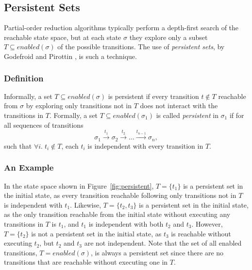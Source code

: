 \documentclass[12pt,a4paper,twoside,openright]{report}
\begin{document}
\subsection{Persistent Sets}
\label{sec:persistent}

Partial-order reduction algorithms typically 
perform a depth-first
search of the reachable state space, but at each
state $\sigma$ they explore only a subset
$T \subseteq \textit{enabled}(\sigma)$
of the possible transitions.
The use of \textit{persistent sets},
by Godefroid and Pirottin \cite{god93},
is such a technique.

\subsubsection{Definition}

Informally,
a set $T \subseteq \textit{enabled}(\sigma)$
is persistent if every
transition $t \not \in T$ reachable
from $\sigma$ by exploring only transitions not in
$T$ does not interact with the transitions
in $T$. Formally, a set
$T \subseteq \textit{enabled}(\sigma_1)$
is called \emph{persistent} in $\sigma_1$ if
for all sequences of transitions
\[
	\sigma_1 \xrightarrow{\ t_1\ } \sigma_2 \xrightarrow{\ t_2\ } \ldots
	\xrightarrow{t_{n-1}} \sigma_n,
\]
such that $\forall i.\; t_i \not \in T$,
each $t_i$ is
independent with every transition in $T$.

\subsubsection{An Example}
In the state space shown in
Figure~\ref{fig:persistent}, $T = \{t_1\}$ is
a persistent set in the initial state, as every
transition reachable following only transitions
not in $T$ is independent with $t_1$.
Likewise, $T = \{t_2, t_3\}$ is
a persistent set in the initial state, as the
only transition reachable from the initial state
without executing any transitions in $T$ is $t_1$,
and $t_1$ is independent with both $t_2$ and $t_3$.
However, $T = \{t_2\}$ is not a persistent set in the
initial state, as $t_3$ is reachable without
executing $t_2$, but $t_2$ and $t_3$ are not independent.
Note that the set of all enabled transitions,
$T = \textit{enabled}(\sigma)$, is always a
persistent set since there are no transitions
that are reachable without executing one in $T$.
\end{document}

